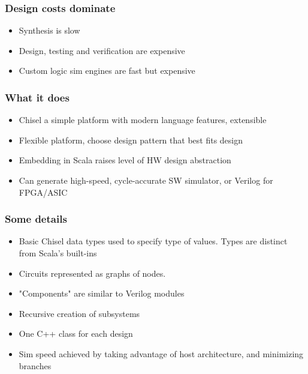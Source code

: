 \documentclass{beamer}
\begin{document}
\begin{frame}
\frametitle{Design costs dominate}
\begin{itemize}

\item Synthesis is slow

\item Design, testing and verification are expensive

\item Custom logic sim engines are fast but expensive

\end{itemize}
\end{frame}

\begin{frame}
\frametitle{What it does}
\begin{itemize}

\item Chisel a simple platform with modern language features, extensible

\item Flexible platform, choose design pattern that best fits design

\item Embedding in Scala raises level of HW design abstraction

\item Can generate high-speed, cycle-accurate SW simulator, or Verilog for FPGA/ASIC

\end{itemize}
\end{frame}

\begin{frame}
\frametitle{Some details}
\begin{itemize}
\item Basic Chisel data types used to specify type of values. Types are distinct from Scala's built-ins

\item Circuits represented as graphs of nodes.

\item "Components" are similar to Verilog modules

\item Recursive creation of subsystems

\item One C++ class for each design

\item Sim speed achieved by taking advantage of host architecture, and minimizing branches

\end{itemize}
\end{frame}
\end{document}
